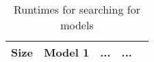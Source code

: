 \begin{table}[t]
  \centering
  \begin{tabular}[t]{|c|c|c|c|c|}\hline
    Size & Model 1 & ... & ... & \\\hline
  \end{tabular}
  \caption{Runtimes for searching for models}
  \label{tab:qf-grabh}
\end{table}


